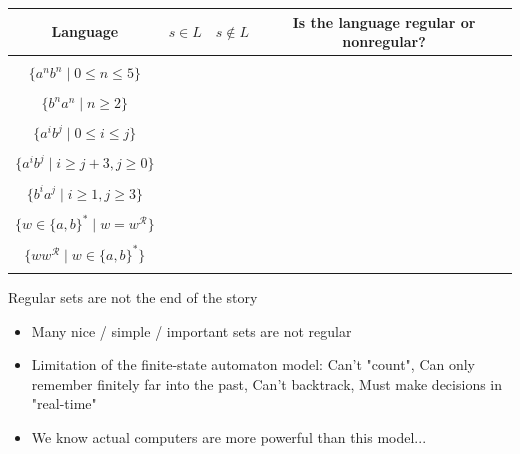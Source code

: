 

\begin{center}
    \begin{tabular}{c|c| c| c}
    Language & $s \in L$ & $s \notin L$ & Is the language regular or nonregular?  \\
    \hline
     & \hspace{1in} & \hspace{1in}  &  \\
    $\{a^nb^n \mid 0  \leq n  \leq 5 \}$ & & & \\
     & & & \\
    $\{b^n a^n \mid  n  \geq 2\}$  & & & \\
     & & & \\
    $\{a^i b^j \mid  0 \leq i \leq j\}$  & & & \\
     & & & \\
    $\{a^i b^j \mid  i \geq j+3,  j \geq 0\}$  & & & \\
     & & & \\
    $\{b^i a^j \mid  i \geq 1, j \geq  3\}$  & & & \\
     & & & \\
    $\{ w  \in \{a,b\}^* \mid w = w^\mathcal{R} \}$ & & & \\
     & & & \\ 
    $\{ ww^\mathcal{R} \mid w\in \{a,b\}^* \}$ & & & \\
     & & & \\ 
    \end{tabular}
\end{center}
    
\newpage
Regular sets are not the end of the story
\begin{itemize}
    \item Many nice / simple / important sets are not regular
    \item Limitation of the finite-state automaton model: Can't "count", Can only remember finitely far into the past,
    Can't backtrack, Must make decisions in "real-time"
    \item We know actual computers are more powerful than this model...
\end{itemize}

